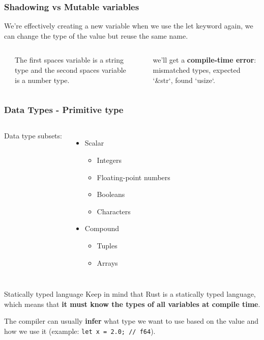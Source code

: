 \documentclass{beamer}
\begin{document}
	\begin{frame}[fragile]
		\frametitle{Shadowing vs Mutable variables}
		
		We’re effectively creating a new variable when we use the let keyword again, we can change the type of the value but reuse the same name.
		
		\begin{columns}
			\inputminted{rust}{./code/shadowing-vs-mutable-var1.rs}
			The first spaces variable is a string type and the second spaces variable is a number type. 
			\inputminted{rust}{./code/shadowing-vs-mutable-var2.rs}
			we’ll get a \textbf{compile-time error}: mismatched types, expected `\&str`, found `usize`.
		\end{columns}
	\end{frame}
	
	\begin{frame}[fragile]
		\frametitle{Data Types - Primitive type}
		\begin{columns}
			\column{0.5\textwidth}
			Data type subsets: 
			\begin{itemize}
				\item Scalar
				\begin{itemize}
					\item Integers
					\item Floating-point numbers
					\item Booleans
					\item Characters
				\end{itemize}
				\item Compound
				\begin{itemize}
					\item Tuples 
					\item Arrays
				\end{itemize}
			\end{itemize}
			\column{0.5\textwidth}
			\inputminted{rust}{./code/data-types.rs}
		\end{columns}
		
		\begin{block}{Statically typed language}
			Keep in mind that Rust is a statically typed language, which means that \textbf{it must know the types of all variables at compile time}. 
		\end{block}
		
		The compiler can usually \textbf{infer} what type we want to use based on the value and how we use it (example: \texttt{let x = 2.0; // f64}).
		
	\end{frame}
	
\end{document}
